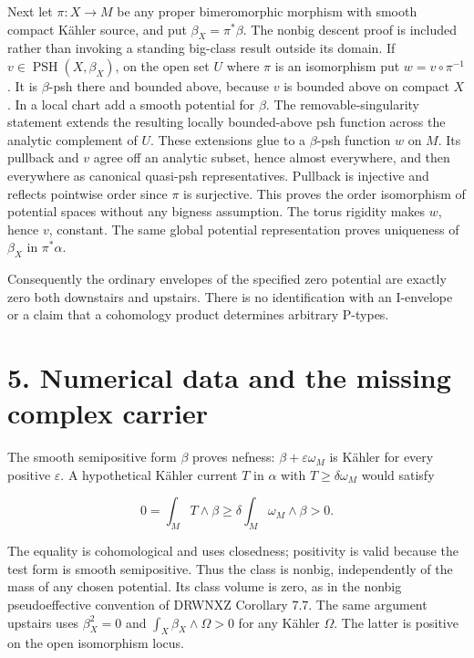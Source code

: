 \documentclass[11pt]{article}
\begin{document}
Next let $\pi:X\to M$ be any proper bimeromorphic morphism with smooth compact Kähler source, and put $\beta_X=\pi^*\beta$. The nonbig descent proof is included rather than invoking a standing big-\allowbreak{}class result outside its domain. If $v\in\operatorname{PSH}(X,\beta_X)$, on the open set $U$ where $\pi$ is an isomorphism put $w=v\circ\pi^{-1}$. It is $\beta$-\allowbreak{}psh there and bounded above, because $v$ is bounded above on compact $X$. In a local chart add a smooth potential for $\beta$. The removable-\allowbreak{}singularity statement extends the resulting locally bounded-\allowbreak{}above psh function across the analytic complement of $U$. These extensions glue to a $\beta$-\allowbreak{}psh function $w$ on $M$. Its pullback and $v$ agree off an analytic subset, hence almost everywhere, and then everywhere as canonical quasi-\allowbreak{}psh representatives. Pullback is injective and reflects pointwise order since $\pi$ is surjective. This proves the order isomorphism of potential spaces without any bigness assumption. The torus rigidity makes $w$, hence $v$, constant. The same global potential representation proves uniqueness of $\beta_X$ in $\pi^*\alpha$.

Consequently the ordinary envelopes of the specified zero potential are exactly zero both downstairs and upstairs. There is no identification with an I-\allowbreak{}envelope or a claim that a cohomology product determines arbitrary P-\allowbreak{}types.

\section*{5. Numerical data and the missing complex carrier}

The smooth semipositive form $\beta$ proves nefness: $\beta+\varepsilon\omega_M$ is Kähler for every positive $\varepsilon$. A hypothetical Kähler current $T$ in $\alpha$ with $T\geq\delta\omega_M$ would satisfy

\[0=\int_M T\wedge\beta\geq\delta\int_M\omega_M\wedge\beta>0.\]

The equality is cohomological and uses closedness; positivity is valid because the test form is smooth semipositive. Thus the class is nonbig, independently of the mass of any chosen potential. Its class volume is zero, as in the nonbig pseudoeffective convention of DRWNXZ Corollary 7.7. The same argument upstairs uses $\beta_X^2=0$ and $\int_X\beta_X\wedge\Omega>0$ for any Kähler $\Omega$. The latter is positive on the open isomorphism locus.
\end{document}
